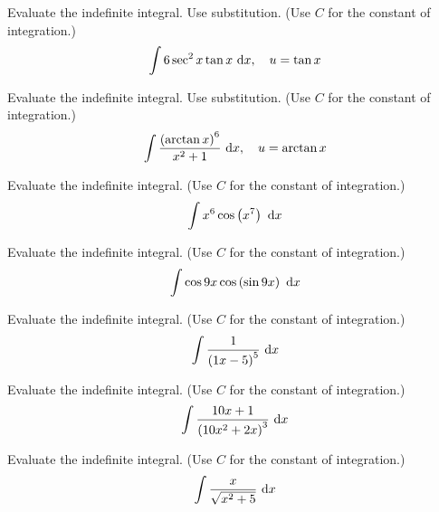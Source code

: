 \documentclass[12pt,addpoints, answers, fleqn]{exam}
\begin{document}
\begin{teacher}
\begin{questions}
Evaluate the indefinite integral. Use substitution. (Use $C$ for the constant of integration.)
\[
\int 6 \sec^2 x \tan x \ {\rm{d}} x, \quad u = \tan x
\]

\begin{solution}
\end{solution}
\question 	%

Evaluate the indefinite integral. Use substitution. (Use $C$ for the constant of integration.)
\[
\int \frac{\left(\arctan x\right)^6}{x^2+1} \ {\rm{d}} x, \quad u = \arctan x
\]

\begin{solution}
\end{solution}
\question 	%

Evaluate the indefinite integral. (Use $C$ for the constant of integration.)
\[
\int x^6 \cos \left( x^7\right) \ {\rm{d}} x
\]

\begin{solution}
\end{solution}
\question 	%

Evaluate the indefinite integral. (Use $C$ for the constant of integration.)
\[
\int \cos  9 x  \cos \left( \sin 9 x \right) \ {\rm{d}} x
\]
\begin{solution}
\end{solution}

\question 	%

Evaluate the indefinite integral. (Use $C$ for the constant of integration.)
\[
\int \frac{1}{\left(1x-5\right)^5} \ {\rm{d}} x
\]

\begin{solution}
\end{solution}
\question 	%

Evaluate the indefinite integral. (Use $C$ for the constant of integration.)
\[
\int \frac{10x+1}{\left(10x^2+2x\right)^3} \ {\rm{d}} x
\]
\begin{solution}
\end{solution}

\question 	%

Evaluate the indefinite integral. (Use $C$ for the constant of integration.)
\[
\int \frac{x}{\sqrt{x^2+5}} \ {\rm{d}} x
\]

\begin{solution}
\end{solution}
\question 	%


\end{questions}
\end{teacher}
\end{document}
